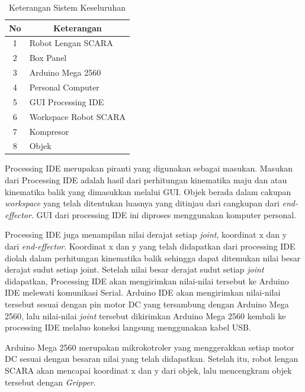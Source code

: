 \begin{table}[H]
	\centering
	\caption{Keterangan Sistem Keseluruhan}

		\begin{tabular}{|c|l|}
			\hline
			\rowcolor[HTML]{9B9B9B} 
			No & \multicolumn{1}{c|}{\cellcolor[HTML]{9B9B9B}Keterangan} \\ \hline
			1  & Robot Lengan SCARA                                      \\ \hline
			2  & Box Panel                                               \\ \hline
			3  & Arduino Mega 2560                                       \\ \hline
			4  & Personal Computer                                       \\ \hline
			5  & GUI Processing IDE                                      \\ \hline
			6  & Workspace Robot SCARA                                   \\ \hline
			7  & Kompresor                                               \\ \hline
			8  & Objek                                                   \\ \hline
		\end{tabular}

\end{table}
Processing IDE merupakan piranti yang digunakan sebagai masukan. Masukan dari Processing IDE adalah hasil dari perhitungan kinematika maju dan atau kinematika balik yang dimasukkan melalui GUI. Objek berada dalam cakupan \textit{workspace} yang telah ditentukan luasnya yang ditinjau dari cangkupan dari \textit{end-effector}. GUI dari processing IDE ini diproses menggunakan komputer personal.  

Processing IDE juga menampilan nilai derajat setiap \textit{joint}, koordinat x dan y dari \textit{end-effector}. Koordinat x dan y yang telah didapatkan dari processing IDE diolah dalam perhitungan kinematika balik sehingga dapat ditemukan nilai besar derajat sudut setiap joint. Setelah nilai besar derajat sudut setiap \textit{joint} didapatkan, Processing IDE akan mengirimkan nilai-nilai tersebut ke Arduino IDE melewati komunikasi Serial. Arduino IDE akan mengirimkan nilai-nilai tersebut sesuai dengan pin motor DC yang tersambung dengan Arduino Mega 2560, lalu nilai-nilai \textit{joint}  tersebut dikirimkan Arduino Mega 2560 kembali ke processing IDE melaluo koneksi langsung menggunakan kabel USB.  

Arduino Mega 2560 merupakan mikrokotroler yang menggerakkan setiap motor DC sesuai dengan besaran nilai yang telah didapatkan. Setelah itu, robot lengan SCARA akan mencapai koordinat x dan y dari objek, lalu mencengkram objek tersebut dengan \textit{Gripper}.
